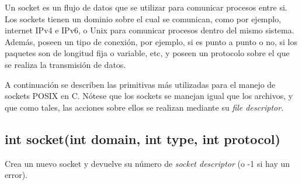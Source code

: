 \documentclass[oneside]{article}
\numberwithin{equation}{section}
\numberwithin{figure}{section}
\numberwithin{table}{section}
\begin{document}
		Un socket es un flujo de datos que se utilizar para comunicar procesos entre si. Los sockets tienen un dominio sobre el cual se comunican, como por ejemplo, internet IPv4 e IPv6, o Unix para comunicar procesos dentro del mismo sistema. Además, poseen un tipo de conexión, por ejemplo, si es punto a punto o no, si los paquetes son de longitud fija o variable, etc, y poseen un protocolo sobre el que se realiza la transmisión de datos.
		
		
		A continuación se describen las primitivas más utilizadas para el manejo de sockets POSIX en C. Nótese que los sockets se manejan igual que los archivos, y que como tales, las acciones sobre ellos se realizan mediante su \emph{file descriptor}.
	
		\subsection{int socket(int domain, int type, int protocol)}
		Crea un nuevo socket y devuelve su número de \emph{socket descriptor} (o -1 si hay un error).\\
\end{document}
